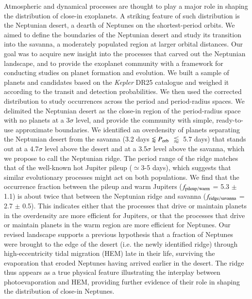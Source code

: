 \documentclass[]{aa}
\begin{document}
  \abstract
   {Atmospheric and dynamical processes are thought to play a major role in shaping the distribution of close-in exoplanets. A striking feature of such distribution is the Neptunian desert, a dearth of Neptunes on the shortest-period orbits.}
   {We aimed to define the boundaries of the Neptunian desert and study its transition into the savanna, a moderately populated region at larger orbital distances. Our goal was to acquire new insight into the processes that carved out the Neptunian landscape, and to provide the exoplanet community with a framework for conducting studies on planet formation and evolution.}
   {We built a sample of planets and candidates based on the \textit{Kepler} DR25 catalogue and weighed it according to the transit and detection probabilities. We then used the corrected distribution to study occurrences across the period and period-radius spaces.}
   {We delimited the Neptunian desert as the close-in region of the period-radius space with no planets at a 3$\sigma$ level, and provide the community with simple, ready-to-use approximate boundaries. We identified an overdensity of planets separating the Neptunian desert from the savanna (3.2 days $ \lessapprox P_{\rm orb}$ $\lessapprox$ 5.7 days) that stands out at a 4.7$\sigma$ level above the desert and at a 3.5$\sigma$ level above the savanna, which we propose to call the Neptunian ridge. The period range of the ridge matches that of the well-known hot Jupiter pileup ($\simeq$3-5 days), which suggests that similar evolutionary processes might act on both populations. We find that the occurrence fraction between the pileup and warm Jupiters ($f_{\rm pileup/warm}$ = 5.3 $\pm$ 1.1) is about twice that between the Neptunian ridge and savanna ($f_{\rm ridge/savanna}$ = 2.7 $\pm$ 0.5). This indicates either that the processes that drive or maintain planets in the overdensity are more efficient for Jupiters, or that the processes that drive or maintain planets in the warm region are more efficient for Neptunes.}
   {Our revised landscape supports a previous hypothesis that a fraction of Neptunes were brought to the edge of the desert (i.e. the newly identified ridge) through high-eccentricity tidal migration (HEM) late in their life, surviving the evaporation that eroded Neptunes having arrived earlier in the desert. The ridge thus appears as a true physical feature illustrating the interplay between photoevaporation and HEM, providing further evidence of their role in shaping the distribution of close-in Neptunes.}
\end{document}

